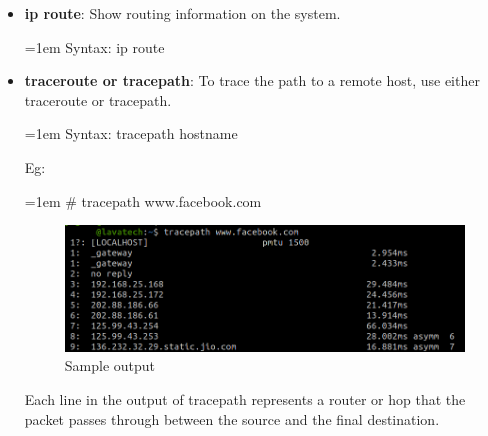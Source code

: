 \begin{flushleft}
\begin{itemize}
\begin{itemize}
		\newpage
		\item \textbf{ip route}: Show routing information on the system.
		\bigskip
		\begin{tcolorbox}[breakable,notitle,boxrule=0pt,colback=pink,colframe=pink]
				\color{black}
				\font=1em
				Syntax: ip route
				\font=4pt
		\end{tcolorbox}						
		\bigskip
		\bigskip
		\item \textbf{traceroute or tracepath}: To trace the path to a remote host, use either traceroute or tracepath.
		\bigskip
		\begin{tcolorbox}[breakable,notitle,boxrule=0pt,colback=pink,colframe=pink]
				\color{black}
				\font=1em
				Syntax: tracepath hostname
				\font=4pt
		\end{tcolorbox}					
		Eg:
		\begin{tcolorbox}[breakable,notitle,boxrule=-0pt,colback=black,colframe=black]
			\color{green}
			\font=1em
			\# tracepath www.facebook.com
			\font=4pt
		\end{tcolorbox}
		\begin{figure}[h!]
			\centering
			\includegraphics[scale=0.35]{content/chapter15/images/trace.png}
			\caption{Sample output}
			\label{fig:output75}
		\end{figure}
		Each line in the output of tracepath represents a router or hop that the packet passes through
		between the source and the final destination.
			
	\end{itemize}


	
\end{itemize}

\end{flushleft}
\newpage


